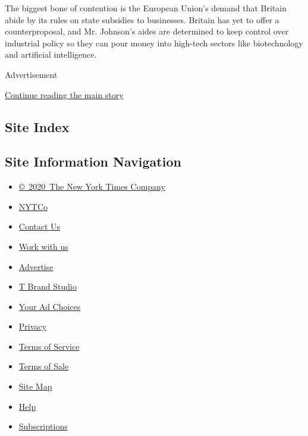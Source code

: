The biggest bone of contention is the European Union's demand that
Britain abide by its rules on state subsidies to businesses. Britain has
yet to offer a counterproposal, and Mr. Johnson's aides are determined
to keep control over industrial policy so they can pour money into
high-tech sectors like biotechnology and artificial intelligence.

Advertisement

\protect\hyperlink{after-bottom}{Continue reading the main story}

\hypertarget{site-index}{%
\subsection{Site Index}\label{site-index}}

\hypertarget{site-information-navigation}{%
\subsection{Site Information
Navigation}\label{site-information-navigation}}

\begin{itemize}
\tightlist
\item
  \href{https://help.nytimes3xbfgragh.onion/hc/en-us/articles/115014792127-Copyright-notice}{©~2020~The
  New York Times Company}
\end{itemize}

\begin{itemize}
\tightlist
\item
  \href{https://www.nytco.com/}{NYTCo}
\item
  \href{https://help.nytimes3xbfgragh.onion/hc/en-us/articles/115015385887-Contact-Us}{Contact
  Us}
\item
  \href{https://www.nytco.com/careers/}{Work with us}
\item
  \href{https://nytmediakit.com/}{Advertise}
\item
  \href{http://www.tbrandstudio.com/}{T Brand Studio}
\item
  \href{https://www.nytimes3xbfgragh.onion/privacy/cookie-policy\#how-do-i-manage-trackers}{Your
  Ad Choices}
\item
  \href{https://www.nytimes3xbfgragh.onion/privacy}{Privacy}
\item
  \href{https://help.nytimes3xbfgragh.onion/hc/en-us/articles/115014893428-Terms-of-service}{Terms
  of Service}
\item
  \href{https://help.nytimes3xbfgragh.onion/hc/en-us/articles/115014893968-Terms-of-sale}{Terms
  of Sale}
\item
  \href{https://spiderbites.nytimes3xbfgragh.onion}{Site Map}
\item
  \href{https://help.nytimes3xbfgragh.onion/hc/en-us}{Help}
\item
  \href{https://www.nytimes3xbfgragh.onion/subscription?campaignId=37WXW}{Subscriptions}
\end{itemize}
